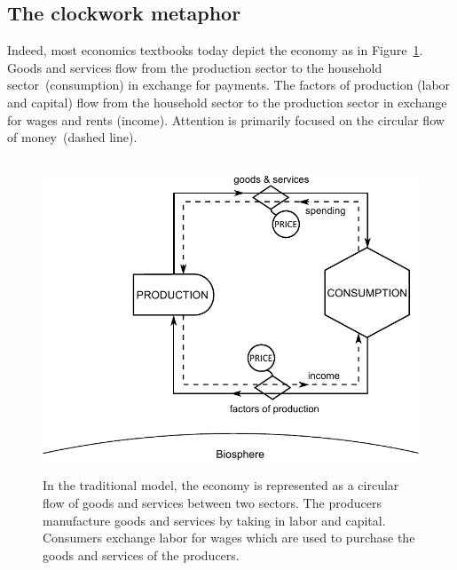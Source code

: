 \subsection{The clockwork metaphor}
\label{sec:clockwork_metaphor}

Indeed, most economics textbooks today depict the economy 
as in Figure~\ref{fig:perp_motion_1}.
Goods and services flow from the production sector
to the household sector~(consumption)
in exchange for payments.
The factors of production (labor and capital)
flow from the household sector to the
production sector in exchange for wages and rents (income).
Attention is primarily focused on the circular flow
of money~(dashed line).


\begin{figure}[!ht]
\centering\
\includegraphics[width=\linewidth]{Part_0/Chapter_Introduction/images/Perpetual_motion_1.pdf}
\caption[The traditional model]{In the traditional model, the economy 
is represented as a circular flow of goods and services between two sectors. 
The producers manufacture goods and services 
by taking in labor and capital. 
Consumers exchange labor for wages 
which are used to purchase 
the goods and services of the producers.}
\label{fig:perp_motion_1}
\end{figure}


